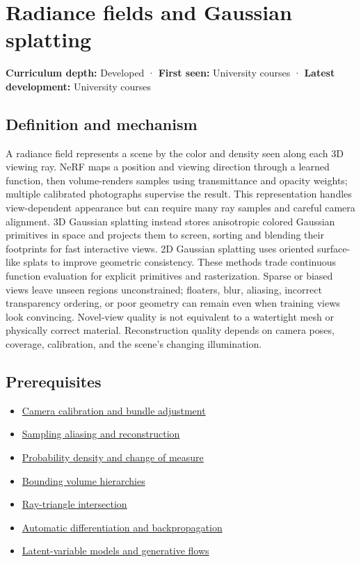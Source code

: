 \hypertarget{appendix-c5b332e400e7}{}\label{referencestart:appendix-c5b332e400e7}
\section{Radiance fields and Gaussian splatting}\label{appendix-c5b332e400e7-radiance-fields-and-gaussian-splatting}

\textbf{Curriculum depth:} Developed · \textbf{First seen:} University courses · \textbf{Latest development:} University courses

\subsection{Definition and mechanism}\label{appendix-c5b332e400e7-definition-and-mechanism}

A radiance field represents a scene by the color and density seen along each 3D viewing ray. NeRF maps a position and viewing direction through a learned function, then volume-renders samples using transmittance and opacity weights; multiple calibrated photographs supervise the result. This representation handles view-dependent appearance but can require many ray samples and careful camera alignment. 3D Gaussian splatting instead stores anisotropic colored Gaussian primitives in space and projects them to screen, sorting and blending their footprints for fast interactive views. 2D Gaussian splatting uses oriented surface-like splats to improve geometric consistency. These methods trade continuous function evaluation for explicit primitives and rasterization. Sparse or biased views leave unseen regions unconstrained; floaters, blur, aliasing, incorrect transparency ordering, or poor geometry can remain even when training views look convincing. Novel-view quality is not equivalent to a watertight mesh or physically correct material. Reconstruction quality depends on camera poses, coverage, calibration, and the scene's changing illumination.

\subsection{Prerequisites}\label{appendix-c5b332e400e7-prerequisites}

\begin{itemize}
\tightlist
\item
  \hyperref[appendix-3ee9861904d5]{Camera calibration and bundle adjustment}
\item
  \hyperref[appendix-6a7869dd79a6]{Sampling aliasing and reconstruction}
\item
  \hyperref[appendix-4815cd87ab8b]{Probability density and change of measure}
\item
  \hyperref[appendix-0b426c47dd78]{Bounding volume hierarchies}
\item
  \hyperref[appendix-47ac1bd6d144]{Ray-triangle intersection}
\item
  \hyperref[appendix-40df0855b4a7]{Automatic differentiation and backpropagation}
\item
  \hyperref[appendix-2c568f05ee34]{Latent-variable models and generative flows}
\end{itemize}

